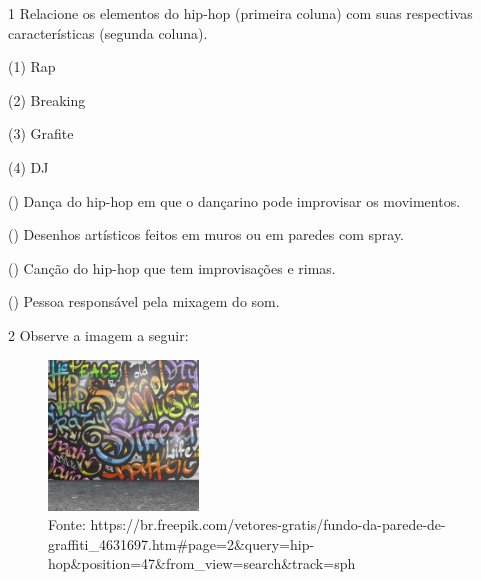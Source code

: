 

\num{1} Relacione os elementos do hip-hop (primeira coluna) com suas respectivas características (segunda coluna).

\begin{multicols}{2}

(1) Rap

(2) Breaking

(3) Grafite

(4) DJ

\columnbreak

() Dança do hip-hop em que o dançarino pode improvisar os movimentos.

() Desenhos artísticos feitos em muros ou em paredes com spray.

() Canção do hip-hop que tem improvisações e rimas.

() Pessoa responsável pela mixagem do som.
\end{multicols}


\num{2} Observe a imagem a seguir:

\begin{figure}[htpb!]
\includegraphics[width=1.57407in,height=1.57407in]{./imgs/img3.jpg}
\caption{Fonte: https://br.freepik.com/vetores-gratis/fundo-da-parede-de-graffiti\_4631697.htm\#page=2\&query=hip-hop\&position=47\&from\_view=search\&track=sph}
\end{figure}

